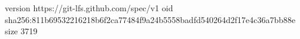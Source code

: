 version https://git-lfs.github.com/spec/v1
oid sha256:811b69532216218b6f2ca77484f9a24b5558badfd540264d2f17e4c36a7bb88e
size 3719
